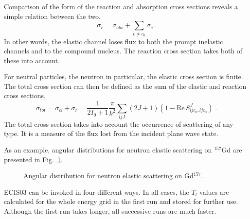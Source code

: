 Comparison of the form of the reaction and absorption cross sections reveals
a simple relation between the two,
\begin{equation}
\sigma_{r}=\sigma_{abs}+\sum_{c\neq c_{0}}\sigma_{c}\,.
\end{equation}
In other words, the elastic channel loses flux to both the prompt inelastic
channels and to the compound nucleus. The reaction cross section takes both
of these into account.

For neutral particles, the neutron in particular, the elastic cross section
is finite. The total cross section can then be defined as the sum of the
elastic and reaction cross sections,
\begin{equation}
\sigma _{tot}=\sigma _{el}+\sigma _{r}=\frac{1}{2I_{0}+1}\frac{\pi }{k^{2}}%
\sum_{ljJ}(2J+1)(1-\text{Re}\,S_{ljc_{0},ljc_{0}}^{J})\;.
\end{equation}%
The total cross section takes into account the occurrence of scattering of
any type. It is a measure of the flux lost from the incident plane wave
state.

As an example, angular distributions for neutron elastic scattering on $%
^{157}$Gd are presented in Fig.~\ref{njoygd157}.
\begin{figure}[htbp]
\caption{Angular distribution for neutron elastic scattering on Gd$^{157}$.}
\label{njoygd157}
\end{figure}

ECIS03%
 can be invoked in four different ways. In all cases, the $T_{l}$
values are calculated for the whole energy grid in the first run and stored
for further use. Although the first run takes longer, all successive runs
are much faster.


